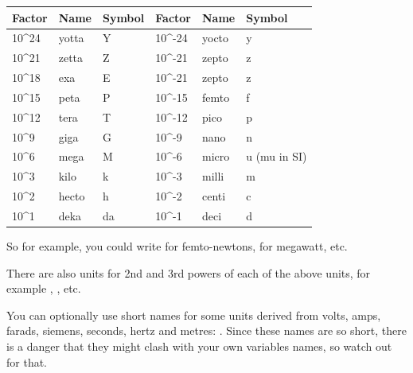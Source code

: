 \documentclass[letterpaper,10pt]{manual}
\begin{document}
\begin{tabulary}{\textwidth}{|L|L|L|L|L|L|}
\hline
\textbf{
Factor
} & \textbf{
Name
} & \textbf{
Symbol
} & \textbf{
Factor
} & \textbf{
Name
} & \textbf{
Symbol
}\\
\hline

10\textasciicircum{}24
 & 
yotta
 & 
Y
 & 
10\textasciicircum{}-24
 & 
yocto
 & 
y
\\

10\textasciicircum{}21
 & 
zetta
 & 
Z
 & 
10\textasciicircum{}-21
 & 
zepto
 & 
z
\\

10\textasciicircum{}18
 & 
exa
 & 
E
 & 
10\textasciicircum{}-21
 & 
zepto
 & 
z
\\

10\textasciicircum{}15
 & 
peta
 & 
P
 & 
10\textasciicircum{}-15
 & 
femto
 & 
f
\\

10\textasciicircum{}12
 & 
tera
 & 
T
 & 
10\textasciicircum{}-12
 & 
pico
 & 
p
\\

10\textasciicircum{}9
 & 
giga
 & 
G
 & 
10\textasciicircum{}-9
 & 
nano
 & 
n
\\

10\textasciicircum{}6
 & 
mega
 & 
M
 & 
10\textasciicircum{}-6
 & 
micro
 & 
u (mu in SI)
\\

10\textasciicircum{}3
 & 
kilo
 & 
k
 & 
10\textasciicircum{}-3
 & 
milli
 & 
m
\\

10\textasciicircum{}2
 & 
hecto
 & 
h
 & 
10\textasciicircum{}-2
 & 
centi
 & 
c
\\

10\textasciicircum{}1
 & 
deka
 & 
da
 & 
10\textasciicircum{}-1
 & 
deci
 & 
d
\\
\hline
\end{tabulary}


So for example, you could write  for femto-newtons,  for megawatt, etc.

There are also units for 2nd and 3rd powers of each of the above units, for example
, , etc.

You can optionally use short names for some units derived from volts, amps,
farads, siemens, seconds, hertz and metres:
.
Since these names are so short, there is a danger that they might clash with your
own variables names, so watch out for that.
\end{document}
